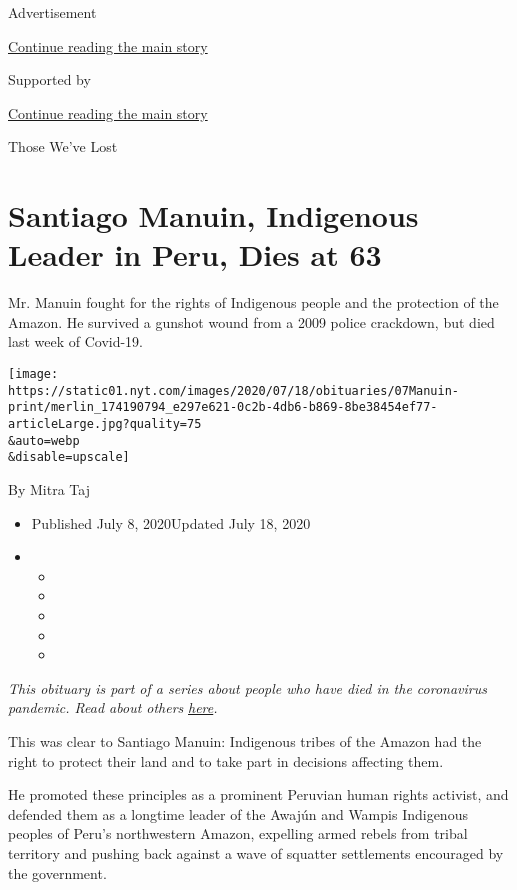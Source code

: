 Advertisement

\protect\hyperlink{after-top}{Continue reading the main story}

Supported by

\protect\hyperlink{after-sponsor}{Continue reading the main story}

Those We've Lost

\hypertarget{santiago-manuin-indigenous-leader-in-peru-dies-at-63}{%
\section{Santiago Manuin, Indigenous Leader in Peru, Dies at
63}\label{santiago-manuin-indigenous-leader-in-peru-dies-at-63}}

Mr. Manuin fought for the rights of Indigenous people and the protection
of the Amazon. He survived a gunshot wound from a 2009 police crackdown,
but died last week of Covid-19.

\texttt{[image: https://static01.nyt.com/images/2020/07/18/obituaries/07Manuin-print/merlin\_174190794\_e297e621-0c2b-4db6-b869-8be38454ef77-articleLarge.jpg?quality=75\\\&auto=webp\\\&disable=upscale]}

By Mitra Taj

\begin{itemize}
\item
  Published July 8, 2020Updated July 18, 2020
\item
  \begin{itemize}
  \item
  \item
  \item
  \item
  \item
  \end{itemize}
\end{itemize}

\emph{This obituary is part of a series about people who have died in
the coronavirus pandemic. Read about others}
\href{https://www.nytimes.com/interactive/2020/obituaries/people-died-coronavirus-obituaries.html}{\emph{here}}\emph{.}

This was clear to Santiago Manuin: Indigenous tribes of the Amazon had
the right to protect their land and to take part in decisions affecting
them.

He promoted these principles as a prominent Peruvian human rights
activist, and defended them as a longtime leader of the Awajún and
Wampis Indigenous peoples of Peru's northwestern Amazon, expelling armed
rebels from tribal territory and pushing back against a wave of squatter
settlements encouraged by the government.

